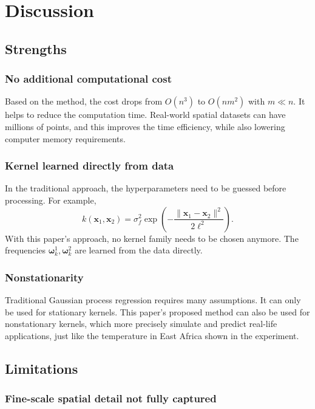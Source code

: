 \documentclass[11pt,a4paper]{article}
\begin{document}
\section{Discussion}

\subsection{Strengths}

\subsubsection{No additional computational cost}
Based on the method, the cost drops from $O(n^3)$ to $O(nm^2)$ with $m \ll n$.
It helps to reduce the computation time. Real-world spatial datasets can have
millions of points, and this improves the time efficiency, while also lowering
computer memory requirements.

\subsubsection{Kernel learned directly from data}
In the traditional approach, the hyperparameters need to be guessed before
processing. For example,
\begin{equation}
  k(\mathbf{x}_1, \mathbf{x}_2) = \sigma_f^2 \exp\!\left(-\frac{\|\mathbf{x}_1 - \mathbf{x}_2\|^2}{2\ell^2}\right).
\end{equation}
With this paper's approach, no kernel family needs to be chosen anymore. The
frequencies $\boldsymbol{\omega}^1_k, \boldsymbol{\omega}^2_k$ are learned
from the data directly.

\subsubsection{Nonstationarity}
Traditional Gaussian process regression requires many assumptions. It can
only be used for stationary kernels. This paper's proposed method can also be
used for nonstationary kernels, which more precisely simulate and predict
real-life applications, just like the temperature in East Africa shown in
the experiment.

\subsection{Limitations}

\subsubsection{Fine-scale spatial detail not fully captured}
\end{document}
